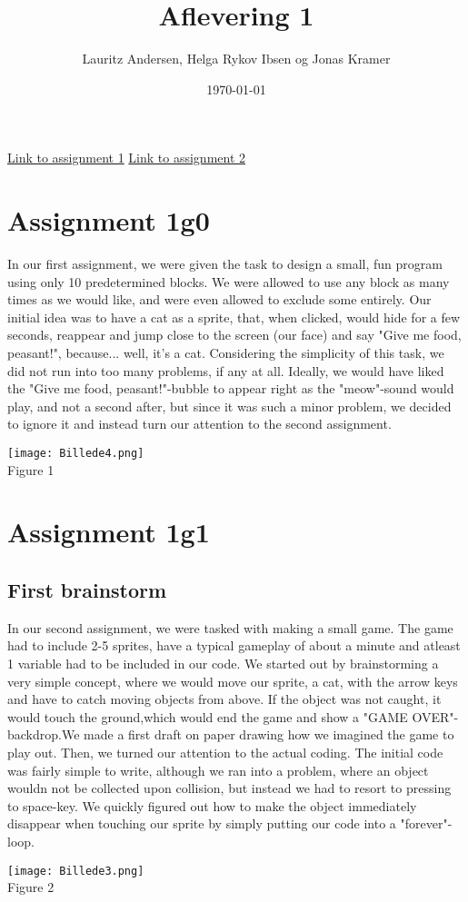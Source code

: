 \documentclass{article}
\begin{document}
\title{Aflevering 1}
\author{Lauritz Andersen, Helga Rykov Ibsen og Jonas Kramer}
\date{\today}
\maketitle

\href{https://tinyurl.com/4nhw867b}{Link to assignment 1}
\newline
\href{https://tinyurl.com/aj6vx638}{Link to assignment 2}

\section{Assignment 1g0}
In our first assignment, we were given the task to design a small, fun program using only 10 predetermined blocks. We were allowed to use any block as many times as we would like, and were even allowed to exclude some entirely. Our initial idea was to have a cat as a sprite, that, when clicked, would hide for a few seconds, reappear and jump close to the screen (our face) and say "Give me food, peasant!", because... well, it's a cat. Considering the simplicity of this task, we did not run into too many problems, if any at all. Ideally, we would have liked the "Give me food, peasant!"-bubble to appear right as the "meow"-sound would play, and not a second after, but since it was such a minor problem, we decided to ignore it and instead turn our attention to the second assignment.
\begin{center}
  \texttt{[image: Billede4.png]}
  \\Figure 1
  \end{center}

\section{Assignment 1g1}
\subsection{First brainstorm}
In our second assignment, we were tasked with making a small game. The game had to include 2-5 sprites, have a typical gameplay of about a minute and atleast 1 variable had to be included in our code. We started out by brainstorming a very simple concept, where we would move our sprite, a cat, with the arrow keys and have to catch moving objects from above. If the object was not caught, it would touch the ground,which would end the game and show a "GAME OVER"-backdrop.We made a first draft on paper drawing how we imagined the game to play out. Then, we turned our attention to the actual coding. The initial code was fairly simple to write, although we ran into a problem, where an object wouldn not be collected upon collision, but instead we had to resort to pressing to space-key. We quickly figured out how to make the object immediately disappear when touching our sprite by simply putting our code into a "forever"-loop.
\begin{center}
  \texttt{[image: Billede3.png]}
  \\Figure 2
  \end{center}
\end{document}

